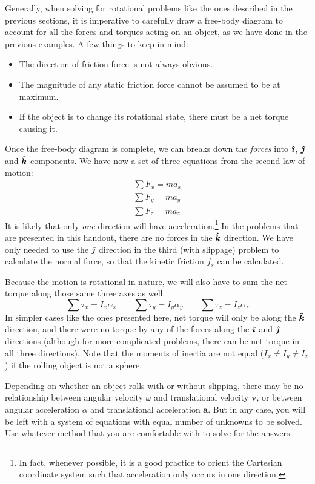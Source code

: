 Generally, when solving for rotational problems like the ones described in the
previous sections, it is imperative to carefully draw a free-body diagram to
account for all the forces and torques acting on an object, as we have done in
the previous examples. A few things to keep in mind:
\begin{itemize}[itemsep=6pt]
\item The direction of friction force is not always obvious.
\item The magnitude of any static friction force cannot be assumed to be at
  maximum.
\item If the object is to change its rotational state, there must be a net
  torque causing it.
\end{itemize}
Once the free-body diagram is complete, we can breaks down the \emph{forces}
into $\bm{\hat\imath}$, $\bm{\hat\jmath}$ and $\bm{\hat k}$ components. We have now a set of three equations
from the second law of motion:
\begin{align*}
  \sum F_x=ma_x\\
  \sum F_y=ma_y\\
  \sum F_z=ma_z
\end{align*}
It is likely that only \emph{one} direction will have acceleration.\footnote{In
  fact, whenever possible, it is a good practice to orient the Cartesian
  coordinate system such that acceleration only occurs in one direction.} In
the problems that are presented in this handout, there are no forces in the
$\bm{\hat k}$ direction. We have only needed to use the $\bm{\hat\jmath}$ direction in the third
(with slippage) problem to calculate the normal force, so that the kinetic
friction $f_s$ can be calculated.

Because the motion is rotational in nature, we will also have to sum the net
torque along those same three axes as well:
\begin{equation*}
  \sum\tau_x=I_x\alpha_x\quad\quad \sum\tau_y=I_y\alpha_y\quad\quad 
  \sum\tau_z=I_z\alpha_z
\end{equation*}
In simpler cases like the ones presented here, net torque will only be along
the $\bm{\hat k}$ direction, and there were no torque by any of the forces along the
$\bm{\hat\imath}$ and $\bm{\hat\jmath}$ directions (although for more complicated problems, there can
be net torque in all three directions). Note that the moments of inertia are
not equal ($I_x\neq I_y\neq I_z$) if the rolling object is not a sphere.

Depending on whether an object rolls with or without slipping, there may be
no relationship between angular velocity $\omega$ and translational velocity
$\bm v$, or between angular acceleration $\alpha$ and translational
acceleration $\bm a$. But in any case, you will be left with a system of
equations with equal number of unknowns to be solved. Use whatever method that
you are comfortable with to solve for the answers.





